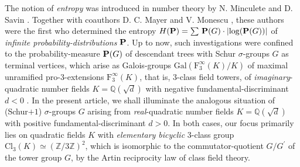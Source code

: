 \documentclass{amsart}
\theoremstyle{definition}
\theoremstyle{remark}
\begin{document}
\noindent
The notion of \textit{entropy} was introduced in number theory
by N. Minculete 
\cite{MiPo2011}
and D. Savin 
\cite{MiSa2023}.
Together with coauthors D. C. Mayer and V. Monescu
\cite{MMSM2026},
these authors were the first who determined the entropy 
\(H({\bf P})=\sum\,{\bf P}(G)\cdot\lvert\log({\bf P}(G))\rvert\)
of \textit{infinite probability-distributions}
\({\bf P}\).
Up to now, such investigations were confined to the probability-measure \({\bf P}(G)\)
of descendant trees with Schur \(\sigma\)-groups \(G\)
\cite{Ag1998}
as terminal vertices, which arise as Galois-groups
\(\mathrm{Gal}(\mathrm{F}_3^\infty(K)/K)\)
of maximal unramified pro-\(3\)-extensions
\(\mathrm{F}_3^\infty(K)\),
that is, \(3\)-class field towers,
of \textit{imaginary}-quadratic number fields
\(K=\mathbb{Q}(\sqrt{d})\)
with negative fundamental-discriminant \(d<0\)
\cite{KoVe1975}.
In the present article, we shall illuminate the analogous situation 
of (Schur\(+1\)) \(\sigma\)-groups \(G\)
\cite{BBH2021}
arising from \textit{real}-quadratic number fields \(K=\mathbb{Q}(\sqrt{d})\)
with positive fundamental-discriminant \(d>0\).
In both cases, our focus primarily lies on quadratic fields \(K\)
with \textit{elementary bicyclic} \(3\)-class group
\(\mathrm{Cl}_3(K)\simeq(\mathbb{Z}/3\mathbb{Z})^2\),
which is isomorphic to the commutator-quotient
\(G/G^\prime\)
of the tower group \(G\),
by the Artin reciprocity law of class field theory.

\end{document}
